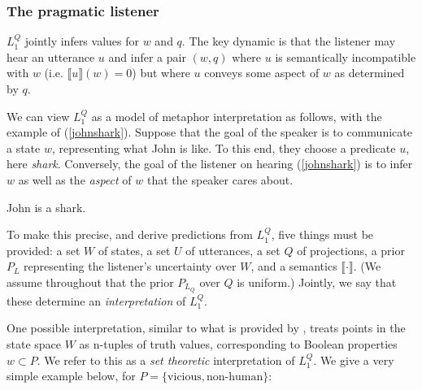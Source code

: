\documentclass[OpenMind]{stjour}
\newcommand{\Listener}{L}
\newcommand{\QLONE}{\Listener_{{1}}^{{Q}}}
\begin{document}
	\subsubsection{The pragmatic listener} $\QLONE$ jointly infers values for $w$ and $q$. The key dynamic is that the listener may hear an utterance $u$ and infer a pair $(w,q)$ where $u$ is semantically incompatible with $w$ (i.e. $\llbracket u\rrbracket(w)=0$) but where $u$ conveys some aspect of $w$ as determined by $q$. 
	
	We can view $\QLONE$ as a model of metaphor interpretation as follows, with the example of (\ref{johnshark}). Suppose that the goal of the speaker is to communicate a state $w$, representing what John is like. To this end, they choose a predicate $u$, here \emph{shark}. Conversely, the goal of the listener on hearing (\ref{johnshark}) is to infer $w$ as well as the \emph{aspect} of $w$ that the speaker cares about.

	\begin{exe}
	\ex John is a shark. \label{johnshark}
	\end{exe}

	
	To make this precise, and derive predictions from $\QLONE$, five things must be provided: a set $W$ of states, a set $U$ of utterances, a set $Q$ of projections, a prior $P_L$ representing the listener's uncertainty over $W$, and a semantics $\llbracket\cdot\rrbracket$. (We assume throughout that the prior $P_{L_Q}$ over $Q$ is uniform.) Jointly, we say that these determine an \emph{interpretation} of $\QLONE$. 

	One possible interpretation, similar to what is provided by \citet{kao}, treats points in the state space $W$ as n-tuples of truth values, corresponding to Boolean properties $w\subset P$.
	We refer to this as a \emph{set theoretic} interpretation of $\QLONE$. We give a very simple example below, for $P = \{\textrm{vicious}, \textrm{non-human} \}$:
\end{document}
